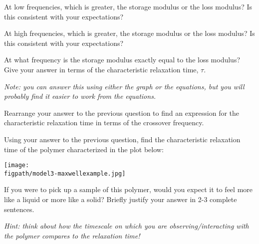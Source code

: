 \begin{activity}
\clearpage
\begin{ctqs}
	\question At low frequencies, which is greater, the storage modulus or the loss modulus?  Is this consistent with your expectations?
	
					\begin{solution}[1.1in]
					\end{solution}
	
	\question At high frequencies, which is greater, the storage modulus or the loss modulus?  Is this consistent with your expectations?
	
					\begin{solution}[1.1in]
					\end{solution}

	\question At what frequency is the storage modulus exactly equal to the loss modulus?  Give your answer in terms of the characteristic relaxation time, $\tau$.
	
		\emph{Note: you can answer this using either the graph or the equations, but you will probably find it easier to work from the equations.}
	
					\begin{solution}[1.75in]
					\end{solution}
	
	\question Rearrange your answer to the previous question to find an expression for the characteristic relaxation time in terms of the crossover frequency.
	
					\begin{solution}[1.25in]
					\end{solution}
	
	\question Using your answer to the previous question, find the characteristic relaxation time of the polymer characterized in the plot below:
				
		\centerline{\texttt{[image: \\figpath/model3-maxwellexample.jpg]}}
	
					\begin{solution}[1.5in]
					\end{solution}
	
	\question If you were to pick up a sample of this polymer, would you expect it to feel more like a liquid or more like a solid?  Briefly justify your answer in 2-3 complete sentences.
	
		\emph{Hint: think about how the timescale on which you are observing/interacting with the polymer compares to the relaxation time!}
	
					\begin{solution}[2in]
					\end{solution}
	

\end{ctqs}
\end{activity}
